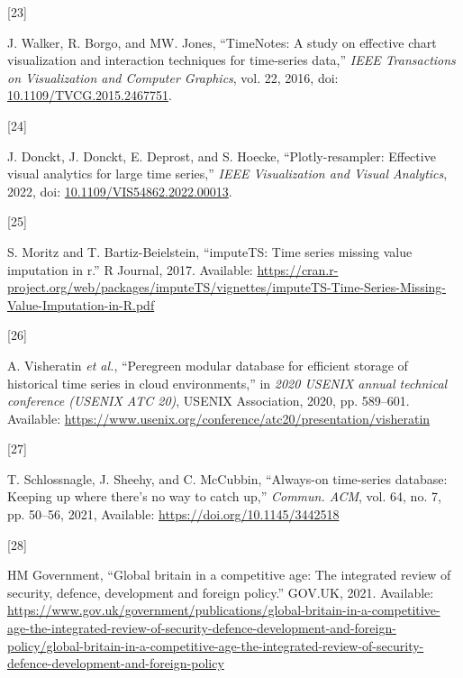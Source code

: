 \documentclass{article}
\newlength{\cslhangindent}
\newlength{\csllabelwidth}
\newlength{\cslentryspacingunit} %
\newenvironment{CSLReferences}[2] %
 {%
  \setlength{\parindent}{0pt}
  \ifodd #1
  \let\oldpar\par
  \def\par{\hangindent=\cslhangindent\oldpar}
  \fi
  \setlength{\parskip}{#2\cslentryspacingunit}
 }%
 {}
\newcommand{\CSLLeftMargin}[1]{\parbox[t]{\csllabelwidth}{#1}}
\newcommand{\CSLRightInline}[1]{\parbox[t]{\linewidth - \csllabelwidth}{#1}\break}
\begin{document}
\begin{CSLReferences}{0}{0}
\leavevmode{}%
\CSLLeftMargin{{[}23{]} }
\CSLRightInline{J. Walker, R. Borgo, and MW. Jones, {``TimeNotes: A
study on effective chart visualization and interaction techniques for
time-series data,''} \emph{IEEE Transactions on Visualization and
Computer Graphics}, vol. 22, 2016, doi:
\href{https://doi.org/10.1109/TVCG.2015.2467751}{10.1109/TVCG.2015.2467751}.}

\leavevmode{}%
\CSLLeftMargin{{[}24{]} }
\CSLRightInline{J. Donckt, J. Donckt, E. Deprost, and S. Hoecke,
{``Plotly-resampler: Effective visual analytics for large time
series,''} \emph{IEEE Visualization and Visual Analytics}, 2022, doi:
\href{https://doi.org/10.1109/VIS54862.2022.00013}{10.1109/VIS54862.2022.00013}.}

\leavevmode{}%
\CSLLeftMargin{{[}25{]} }
\CSLRightInline{S. Moritz and T. Bartiz-Beielstein, {``imputeTS: Time
series missing value imputation in r.''} R Journal, 2017. Available:
\url{https://cran.r-project.org/web/packages/imputeTS/vignettes/imputeTS-Time-Series-Missing-Value-Imputation-in-R.pdf}}

\leavevmode{}%
\CSLLeftMargin{{[}26{]} }
\CSLRightInline{A. Visheratin \emph{et al.}, {``Peregreen {\textendash}
modular database for efficient storage of historical time series in
cloud environments,''} in \emph{2020 USENIX annual technical conference
(USENIX ATC 20)}, USENIX Association, 2020, pp. 589--601. Available:
\url{https://www.usenix.org/conference/atc20/presentation/visheratin}}

\leavevmode{}%
\CSLLeftMargin{{[}27{]} }
\CSLRightInline{T. Schlossnagle, J. Sheehy, and C. McCubbin,
{``Always-on time-series database: Keeping up where there's no way to
catch up,''} \emph{Commun. ACM}, vol. 64, no. 7, pp. 50--56, 2021,
Available: \url{https://doi.org/10.1145/3442518}}

\leavevmode{}%
\CSLLeftMargin{{[}28{]} }
\CSLRightInline{HM Government, {``Global britain in a competitive age:
The integrated review of security, defence, development and foreign
policy.''} GOV.UK, 2021. Available:
\url{https://www.gov.uk/government/publications/global-britain-in-a-competitive-age-the-integrated-review-of-security-defence-development-and-foreign-policy/global-britain-in-a-competitive-age-the-integrated-review-of-security-defence-development-and-foreign-policy}}


\end{CSLReferences}
\end{document}
